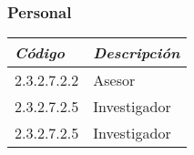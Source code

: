     \subsubsection{Personal}
        \begin{table}[h!]
            \centering
            \begin{tabular}{|p{5cm}|p{5cm}|} \hline
                 
            
            \textit{{\bf{Código}}} &
            \textit{{\bf{Descripción}}}
            \\ \hline

            2.3.2.7.2.2 &
            Asesor
            \\ \hline

            2.3.2.7.2.5 &
            Investigador
            \\ \hline

            2.3.2.7.2.5 &
            Investigador
            \\ \hline

            \end{tabular}
        \end{table}
